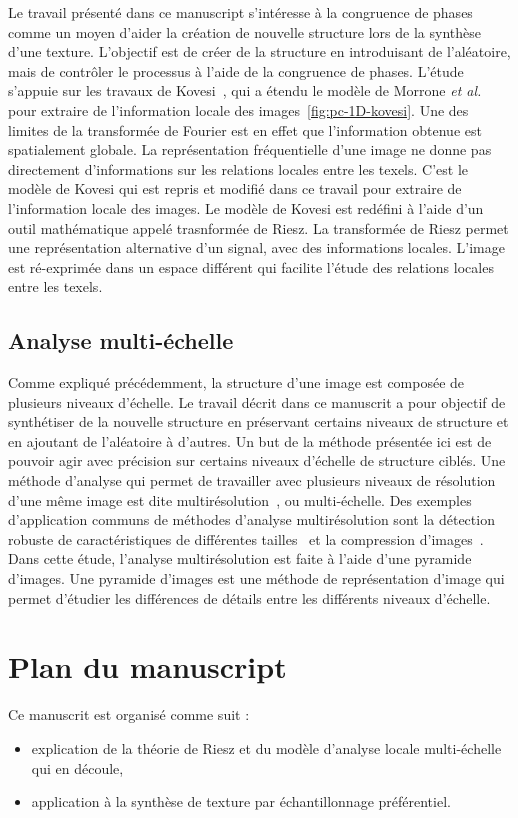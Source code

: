 Le travail présenté dans ce manuscript s'intéresse à la congruence de phases comme un moyen d'aider la création de nouvelle structure lors de la synthèse d'une texture. L'objectif est de créer de la structure en introduisant de l'aléatoire, mais de contrôler le processus à l'aide de la congruence de phases. L'étude s'appuie sur les travaux de Kovesi~\cite{kovesi_image_1995}, qui a étendu le modèle de Morrone \textit{et al.}~\cite{morrone_feature_1987, morrone_feature_1988} pour extraire de l'information locale des images~\ref{fig:pc-1D-kovesi}. Une des limites de la transformée de Fourier est en effet que l'information obtenue est spatialement globale. La représentation fréquentielle d'une image ne donne pas directement d'informations sur les relations locales entre les texels. C'est le modèle de Kovesi qui est repris et modifié dans ce travail pour extraire de l'information locale des images. Le modèle de Kovesi est redéfini à l'aide d'un outil mathématique appelé trasnformée de Riesz. La transformée de Riesz permet une représentation alternative d'un signal, avec des informations locales. L'image est ré-exprimée dans un espace différent qui facilite l'étude des relations locales entre les texels.

\subsection*{Analyse multi-échelle}

Comme expliqué précédemment, la structure d'une image est composée de plusieurs niveaux d'échelle. Le travail décrit dans ce manuscrit a pour objectif de synthétiser de la nouvelle structure en préservant certains niveaux de structure et en ajoutant de l'aléatoire à d'autres. Un but de la méthode présentée ici est de pouvoir agir avec précision sur certains niveaux d'échelle de structure ciblés. Une méthode d'analyse qui permet de travailler avec plusieurs niveaux de résolution d'une même image est dite multirésolution~\cite{mallat_theory_1989}, ou multi-échelle. Des exemples d'application communs de méthodes d'analyse multirésolution sont la détection robuste de caractéristiques de différentes tailles~\cite{park_multiresolution_2010} et la compression d'images~\cite{averbuch_image_1996}. Dans cette étude, l'analyse multirésolution est faite à l'aide d'une pyramide d'images. Une pyramide d'images est une méthode de représentation d'image qui permet d'étudier les différences de détails entre les différents niveaux d'échelle.

\section{Plan du manuscript} %

Ce manuscrit est organisé comme suit :

\begin{itemize}
    \item explication de la théorie de Riesz et du modèle d'analyse locale multi-échelle qui en découle,
    \item application à la synthèse de texture par échantillonnage préférentiel.
\end{itemize}